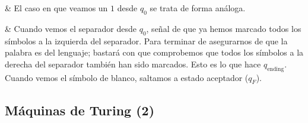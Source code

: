 \begin{easylist}[itemize]
& El caso en que veamos un $1$ desde $q_0$ se trata de forma análoga.

& Cuando vemos el separador desde $q_0$, señal de que ya hemos marcado todos los símbolos a la izquierda del separador. Para terminar de asegurarnos de que la palabra es del lenguaje; bastará con que comprobemos que todos los símbolos a la derecha del separador también han sido marcados. Esto es lo que hace $q_\text{ending}$. Cuando vemos el símbolo de blanco, saltamos a estado aceptador ($q_F$).

\end{easylist}





\subsection{Máquinas de Turing (2)}

